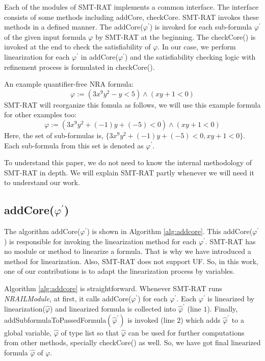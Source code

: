 \noindent Each of the modules of SMT-RAT implements a common interface.
The interface consists of some methods including addCore, checkCore. 
SMT-RAT invokes these methods in a defined manner.
The addCore($\varphi^\prime$) is invoked for each sub-formula $\varphi^\prime$ of the given input formula $\varphi$ by SMT-RAT at the beginning.
The checkCore() is invoked at the end to check the satisfiability of $\varphi$.
In our case, we perform linearization for each $\varphi^\prime$ in addCore($\varphi^\prime$) and the satisfiability checking logic with refinement process is formulated in checkCore().\newline

\begin{example}
\label{example:reorganization}
An example quantifier-free NRA formula:
$$\varphi := (3x^9y^2 -y < 5) \wedge (xy + 1 < 0)$$
SMT-RAT will reorganize this fomula as follows, we will use this example formula for other examples too:
$$\varphi := (3x^9y^2 + (-1)y + (-5) < 0) \wedge (xy + 1 < 0)$$
Here, the set of sub-formulas is, $\{3x^9y^2 + (-1)y + (-5) < 0, xy + 1 < 0\}$.
Each sub-formula from this set is denoted as $\varphi^\prime$.
\end{example}

\noindent To understand this paper, we do not need to know the internal methodology of SMT-RAT in depth.
We will explain SMT-RAT partly whenever we will need it to understand our work.
\subsection{addCore($\varphi^\prime$)}
\label{subsec:addCore}
The algorithm addCore($\varphi^\prime$) is shown in Algorithm \ref{alg:addcore}.
This addCore($\varphi^\prime$) is responsible for invoking the linearization method for each $\varphi^\prime$.
SMT-RAT has no module or method to linearize a formula.
That is why we have introduced a method for linearization.
Also, SMT-RAT does not support UF.
So, in this work, one of our contributions is to adapt the linearization process by variables.\newline

\noindent Algorithm \ref{alg:addcore} is straightforward.
Whenever SMT-RAT runs \textit{NRAILModule}, at first, it calls addCore($\varphi^\prime$) for each $\varphi^\prime$.
Each $\varphi^\prime$ is linearized by linearization($\hat{\varphi}$) and linearized formula is collected into $\hat{\varphi}^\prime$ (line $1$).
Finally, addSubformulaToPassedFormula$( \hat{\varphi}^\prime )$ is invoked (line $2$) which adds $\hat{\varphi}^\prime$ to a global variable, $\hat{\varphi}$ of type list so that $\hat{\varphi}$ can be used for further computations from other methods, specially checkCore() as well.
So, we have got final linearized formula $\hat{\varphi}$ of $\varphi$.\newline

